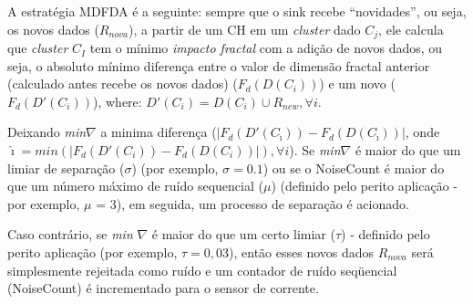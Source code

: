\documentclass{acm_proc_article-sp}
\begin{document}
A estratégia MDFDA é a seguinte: 
sempre que o sink recebe ``novidades'', ou seja, os novos dados ($R_{nova}$),
a partir de um CH em um {\it cluster} dado $C_j$, ele calcula que {\it cluster} $C_I$
tem o mínimo \textit{impacto fractal} com a adição de novos dados, ou seja,
o absoluto mínimo diferença entre o valor de dimensão fractal anterior
(calculado antes recebe os novos dados) ($F_d(D(C_i))$) e um novo ($F_d(D'(C_i))$), where:
 $D'(C_i) = D(C_i) \cup R_{new}, \forall i$.
\vspace*{-.3cm}

Deixando {\it min}$\nabla$ a minima diferença ($|F_d(D'(C_{\hat{\imath}})) -
F_d(D(C_{\hat{\imath}}))|$, onde $\hat{\imath} = min(|F_d(D'(C_i)) -
F_d(D(C_i))|), \forall i$). Se {\it min}$\nabla$ é maior do que 
um limiar de separação ($\sigma$) (por exemplo, $\sigma = 0.1$) ou se
o NoiseCount é maior do que um número máximo de ruído sequencial ($\mu$)
(definido pelo perito aplicação - por exemplo, $\mu$ = 3),  em seguida, um
processo de separação é acionado.
\vspace*{-.3cm}

Caso contrário, se {\it min} $\nabla$ é maior do que um certo limiar ($\tau$)
- definido pelo perito aplicação (por exemplo, $\tau = 0,03$), então 
esses novos dados $R_{nova}$ será simplesmente rejeitada como ruído e 
um contador de ruído seqüencial (NoiseCount) é incrementado para o sensor
de corrente.
\vspace*{-.3cm}
\end{document}
